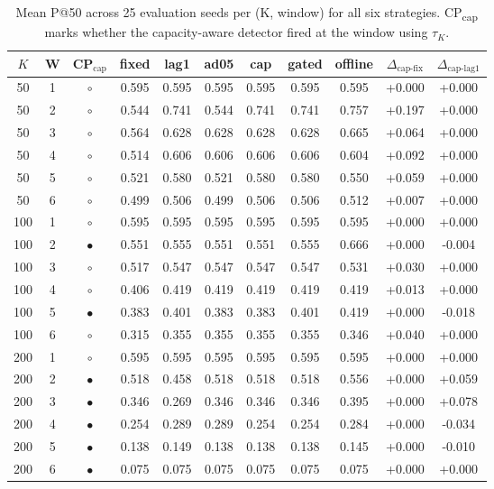 \begin{table}[!t]
  \caption{Mean P@50 across 25 evaluation seeds per (K, window) for all six strategies. CP\textsubscript{cap} marks whether the capacity-aware detector fired at the window using $\tau_K$.}
  \label{tab:main}
  \centering
  \small
  \setlength{\tabcolsep}{4pt}
  \begin{tabular}{cc c cccccc cc}
    \toprule
    $K$ & W & CP$_{\text{cap}}$ & fixed & lag1 & ad05 & cap & gated & offline & $\Delta_{\text{cap-fix}}$ & $\Delta_{\text{cap-lag1}}$ \\
    \midrule
    50 & 1 & $\circ$ & 0.595 & 0.595 & 0.595 & 0.595 & 0.595 & 0.595 & +0.000 & +0.000 \\
    50 & 2 & $\circ$ & 0.544 & 0.741 & 0.544 & 0.741 & 0.741 & 0.757 & +0.197 & +0.000 \\
    50 & 3 & $\circ$ & 0.564 & 0.628 & 0.628 & 0.628 & 0.628 & 0.665 & +0.064 & +0.000 \\
    50 & 4 & $\circ$ & 0.514 & 0.606 & 0.606 & 0.606 & 0.606 & 0.604 & +0.092 & +0.000 \\
    50 & 5 & $\circ$ & 0.521 & 0.580 & 0.521 & 0.580 & 0.580 & 0.550 & +0.059 & +0.000 \\
    50 & 6 & $\circ$ & 0.499 & 0.506 & 0.499 & 0.506 & 0.506 & 0.512 & +0.007 & +0.000 \\
    \midrule
    100 & 1 & $\circ$ & 0.595 & 0.595 & 0.595 & 0.595 & 0.595 & 0.595 & +0.000 & +0.000 \\
    100 & 2 & $\bullet$ & 0.551 & 0.555 & 0.551 & 0.551 & 0.555 & 0.666 & +0.000 & -0.004 \\
    100 & 3 & $\circ$ & 0.517 & 0.547 & 0.547 & 0.547 & 0.547 & 0.531 & +0.030 & +0.000 \\
    100 & 4 & $\circ$ & 0.406 & 0.419 & 0.419 & 0.419 & 0.419 & 0.419 & +0.013 & +0.000 \\
    100 & 5 & $\bullet$ & 0.383 & 0.401 & 0.383 & 0.383 & 0.401 & 0.419 & +0.000 & -0.018 \\
    100 & 6 & $\circ$ & 0.315 & 0.355 & 0.355 & 0.355 & 0.355 & 0.346 & +0.040 & +0.000 \\
    \midrule
    200 & 1 & $\circ$ & 0.595 & 0.595 & 0.595 & 0.595 & 0.595 & 0.595 & +0.000 & +0.000 \\
    200 & 2 & $\bullet$ & 0.518 & 0.458 & 0.518 & 0.518 & 0.518 & 0.556 & +0.000 & +0.059 \\
    200 & 3 & $\bullet$ & 0.346 & 0.269 & 0.346 & 0.346 & 0.346 & 0.395 & +0.000 & +0.078 \\
    200 & 4 & $\bullet$ & 0.254 & 0.289 & 0.289 & 0.254 & 0.254 & 0.284 & +0.000 & -0.034 \\
    200 & 5 & $\bullet$ & 0.138 & 0.149 & 0.138 & 0.138 & 0.138 & 0.145 & +0.000 & -0.010 \\
    200 & 6 & $\bullet$ & 0.075 & 0.075 & 0.075 & 0.075 & 0.075 & 0.075 & +0.000 & +0.000 \\
    \bottomrule
  \end{tabular}
\end{table}
